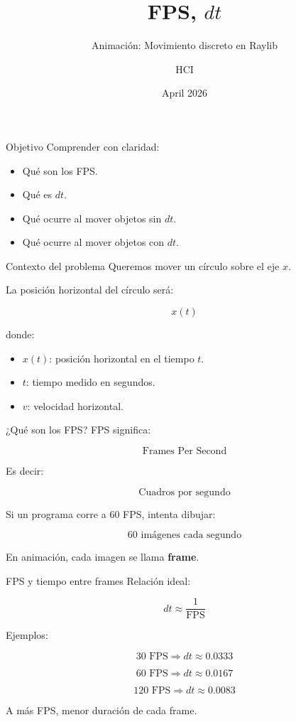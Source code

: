 \documentclass{beamer}
\title{FPS, \(dt\)}
\subtitle{Animación: Movimiento discreto en Raylib}
\author{HCI}
\date{April 2026}
\begin{document}
\begin{frame}
\titlepage
\end{frame}

\begin{frame}{Objetivo}
Comprender con claridad:

\begin{itemize}
    \item Qué son los FPS.
    \item Qué es \(dt\).
    \item Qué ocurre al mover objetos sin \(dt\).
    \item Qué ocurre al mover objetos con \(dt\).
\end{itemize}
\end{frame}

\begin{frame}{Contexto del problema}
Queremos mover un círculo sobre el eje \(x\).

\medskip

La posición horizontal del círculo será:

\[
x(t)
\]

donde:

\begin{itemize}
    \item \(x(t)\): posición horizontal en el tiempo \(t\).
    \item \(t\): tiempo medido en segundos.
    \item \(v\): velocidad horizontal.
\end{itemize}
\end{frame}

\begin{frame}{¿Qué son los FPS?}
FPS significa:

\[
\text{Frames Per Second}
\]

Es decir:

\[
\text{Cuadros por segundo}
\]

\medskip

Si un programa corre a 60 FPS, intenta dibujar:

\[
60 \text{ imágenes cada segundo}
\]

En animación, cada imagen se llama \textbf{frame}.
\end{frame}

\begin{frame}{FPS y tiempo entre frames}
Relación ideal:

\[
dt \approx \frac{1}{\text{FPS}}
\]

\medskip

Ejemplos:

\[
30\text{ FPS} \Rightarrow dt \approx 0.0333
\]

\[
60\text{ FPS} \Rightarrow dt \approx 0.0167
\]

\[
120\text{ FPS} \Rightarrow dt \approx 0.0083
\]

A más FPS, menor duración de cada frame.
\end{frame}
\end{document}
